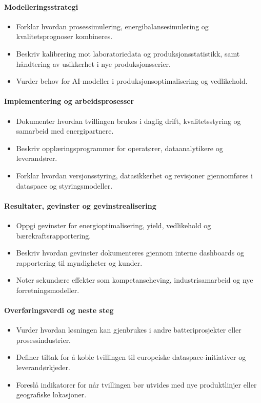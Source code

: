 \paragraph{Modelleringsstrategi}
\begin{itemize}
    \item Forklar hvordan prosessimulering, energibalansesimulering og kvalitetsprognoser kombineres.
    \item Beskriv kalibrering mot laboratoriedata og produksjonsstatistikk, samt håndtering av usikkerhet i nye produksjonsserier.
    \item Vurder behov for AI-modeller i produksjonsoptimalisering og vedlikehold.
\end{itemize}

\paragraph{Implementering og arbeidsprosesser}
\begin{itemize}
    \item Dokumenter hvordan tvillingen brukes i daglig drift, kvalitetsstyring og samarbeid med energipartnere.
    \item Beskriv opplæringsprogrammer for operatører, dataanalytikere og leverandører.
    \item Forklar hvordan versjonsstyring, datasikkerhet og revisjoner gjennomføres i dataspace og styringsmodeller.
\end{itemize}

\paragraph{Resultater, gevinster og gevinstrealisering}
\begin{itemize}
    \item Oppgi gevinster for energioptimalisering, yield, vedlikehold og bærekraftsrapportering.
    \item Beskriv hvordan gevinster dokumenteres gjennom interne dashboards og rapportering til myndigheter og kunder.
    \item Noter sekundære effekter som kompetanseheving, industrisamarbeid og nye forretningsmodeller.
\end{itemize}

\paragraph{Overføringsverdi og neste steg}
\begin{itemize}
    \item Vurder hvordan løsningen kan gjenbrukes i andre batteriprosjekter eller prosessindustrier.
    \item Definer tiltak for å koble tvillingen til europeiske dataspace-initiativer og leverandørkjeder.
    \item Foreslå indikatorer for når tvillingen bør utvides med nye produktlinjer eller geografiske lokasjoner.
\end{itemize}

